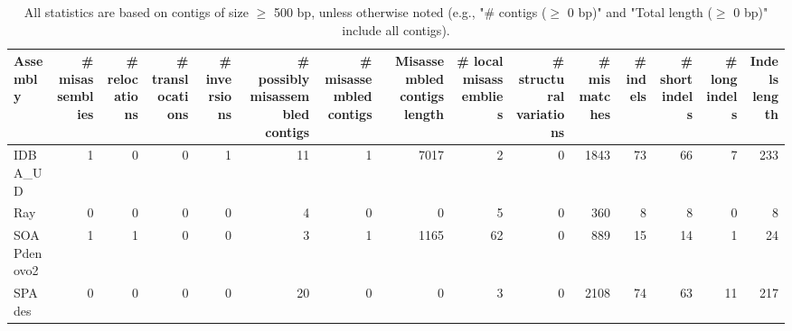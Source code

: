 \documentclass[12pt,a4paper]{article}
\begin{document}
\begin{table}[ht]
\begin{center}
\caption{All statistics are based on contigs of size $\geq$ 500 bp, unless otherwise noted (e.g., "\# contigs ($\geq$ 0 bp)" and "Total length ($\geq$ 0 bp)" include all contigs).}
\begin{tabular}{|l*{14}{|r}|}
\hline
Assembly & \# misassemblies &     \# relocations &     \# translocations &     \# inversions & \# possibly misassembled contigs & \# misassembled contigs & Misassembled contigs length & \# local misassemblies & \# structural variations & \# mismatches & \# indels &     \# short indels &     \# long indels & Indels length \\ \hline
IDBA\_UD & 1 & 0 & 0 & 1 & 11 & 1 & 7017 & 2 & 0 & 1843 & 73 & 66 & 7 & 233 \\ \hline
Ray & 0 & 0 & 0 & 0 & 4 & 0 & 0 & 5 & 0 & 360 & 8 & 8 & 0 & 8 \\ \hline
SOAPdenovo2 & 1 & 1 & 0 & 0 & 3 & 1 & 1165 & 62 & 0 & 889 & 15 & 14 & 1 & 24 \\ \hline
SPAdes & 0 & 0 & 0 & 0 & 20 & 0 & 0 & 3 & 0 & 2108 & 74 & 63 & 11 & 217 \\ \hline
\end{tabular}
\end{center}
\end{table}
\end{document}
